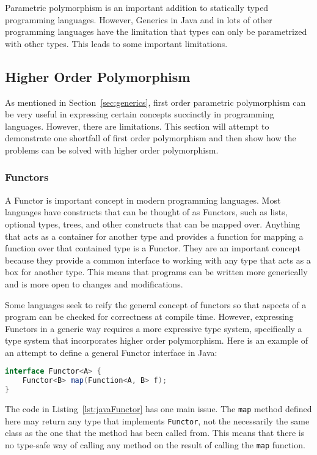 Parametric polymorphism is an important addition to statically typed programming
languages. However, Generics in Java and in lots of other programming languages
have the limitation that types can only be parametrized with other types. 
This leads to some important limitations.

\subsection{Higher Order Polymorphism}
As mentioned in Section~\ref{sec:generics}, first order parametric polymorphism
can be very useful in expressing certain concepts succinctly in programming 
languages. However, there are limitations. This section will attempt to 
demonstrate one shortfall of first order polymorphism and then show how the
problems can be solved with higher order polymorphism.

\subsubsection{Functors}
A Functor is important concept in modern programming languages. Most languages
have constructs that can be thought of as Functors, such as lists, optional types,
trees, and other constructs that can be mapped over. Anything that acts as a
container for another type and provides a function for mapping a function over
that contained type is a Functor. They are an important concept because they
provide a common interface to working with any type that acts as a box for
another type. This means that programs can be written more generically and is
more open to changes and modifications.

Some languages seek to reify the general concept of functors so that aspects of
a program can be checked for correctness at compile time. However, expressing
Functors in a generic way requires a more expressive type system, specifically
a type system that incorporates higher order polymorphism. Here is an example
of an attempt to define a general Functor interface in Java:

\begin{lstlisting}[caption=An attempt to define Functor in Java, language=Java, label={lst:javaFunctor}]
interface Functor<A> {
    Functor<B> map(Function<A, B> f);
}
\end{lstlisting}

The code in Listing~\ref{lst:javaFunctor} has one main issue. The
\lstinline{map} method defined here may return any type that implements
\lstinline{Functor}, not the necessarily the same class as the one that the
method has been called from. This means that there is no type-safe way of
calling any method on the result of calling the \lstinline{map} function.


